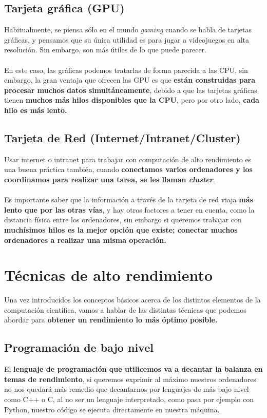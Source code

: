 \subsection{Tarjeta gráfica (GPU)}
Habitualmente, se piensa sólo en el mundo \textit{gaming} cuando se habla de tarjetas gráficas, y pensamos que su única utilidad es para jugar a videojuegos en alta resolución. Sin embargo, son más útiles de lo que puede parecer. \\ \\
En este caso, las gráficas podemos tratarlas de forma parecida a las CPU, sin embargo, la gran ventaja que ofrecen las GPU es que \textbf{están construidas para procesar muchos datos simultáneamente}, debido a que las tarjetas gráficas tienen \textbf{muchos más hilos disponibles que la CPU}, pero por otro lado, \textbf{cada hilo es más lento.}

\subsection{Tarjeta de Red (Internet/Intranet/Cluster)}
Usar internet o intranet para trabajar con computación de alto rendimiento es una buena práctica también, cuando \textbf{conectamos varios ordenadores y los coordinamos para realizar una tarea, se les llaman \textit{cluster}}. \\ \\
Es importante saber que la información a través de la tarjeta de red viaja \textbf{más lento que por las otras vías}, y hay otros factores a tener en cuenta, como la distancia física entre los ordenadores, sin embargo si queremos trabajar con \textbf{muchísimos hilos es la mejor opción que existe; conectar muchos ordenadores a realizar una misma operación.}

\section{Técnicas de alto rendimiento}

Una vez introducidos los conceptos básicos acerca de los distintos elementos de la computación científica, vamos a hablar de las distintas técnicas que podemos abordar para \textbf{obtener un rendimiento lo más óptimo posible.}

\subsection{Programación de bajo nivel}
El \textbf{lenguaje de programación que utilicemos va a decantar la balanza en temas de rendimiento}, si queremos exprimir al máximo nuestros ordenadores no nos quedará más remedio que decantarnos por lenguajes de más bajo nivel como C++ o C, al no ser un lenguaje interpretado, como pasa por ejemplo con Python, nuestro código se ejecuta directamente en nuestra máquina.

